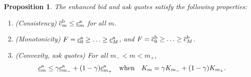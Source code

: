 \documentclass[11pt]{article}
\theoremstyle{plain}
\newtheorem{proposition}[theorem]{Proposition}
\theoremstyle{definition}
\theoremstyle{remark}
\theoremstyle{plain}
\begin{document}
\begin{proposition} \label{prop:bidAsk}
    The enhanced bid and ask quotes satisfy the following properties: 
    \begin{enumerate}[label = (\roman*)]
    \item (Consistency) $\overline{c}^{\rm b}_m \le \underline{c}^{\rm a}_m$ for all $m$.
        \item (Monotonicity) $F = \underline{c}^{\rm a}_0 \ge \ldots \ge \underline{c}^{\rm a}_M$, and $F = \overline{c}^{\rm b}_0 \ge \ldots \ge \overline{c}^{\rm b}_M$. 
        \item (Convexity, ask quotes) For all $m_{-} < m < m_{+} $,  
        \begin{equation}\label{eq:convexity}
            \underline{c}^{\rm a}_{m} \le \gamma\underline{c}^{\rm a}_{m_{-}} + (1-\gamma)\underline{c}^{\rm a}_{m_{+}}\quad \text{when} \quad K_{m} = \gamma K_{m_{-}} + (1-\gamma)K_{m_{+}}.
        \end{equation}
    \end{enumerate}
\end{proposition}
\end{document}

